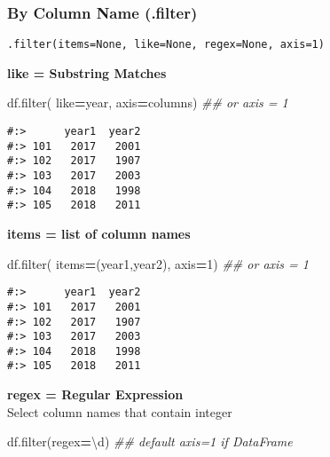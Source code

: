 \documentclass[
]{book}
\newenvironment{Shaded}{\begin{snugshade}}{\end{snugshade}}
\newcommand{\BuiltInTok}[1]{#1}
\newcommand{\CommentTok}[1]{\textcolor[rgb]{0.37,0.37,0.37}{\textit{#1}}}
\newcommand{\DecValTok}[1]{\textcolor[rgb]{0.06,0.06,0.06}{#1}}
\newcommand{\NormalTok}[1]{#1}
\newcommand{\OperatorTok}[1]{\textcolor[rgb]{0.43,0.43,0.43}{\textbf{#1}}}
\newcommand{\StringTok}[1]{\textcolor[rgb]{0.5,0.5,0.5}{#1}}
\begin{document}
\hypertarget{by-column-name-.filter}{%
\subsubsection{By Column Name (.filter)}\label{by-column-name-.filter}}

\texttt{.filter(items=None,\ like=None,\ regex=None,\ axis=1)}

\textbf{like = Substring Matches}

\begin{Shaded}
\begin{Highlighting}[]
\NormalTok{df.}\BuiltInTok{filter}\NormalTok{( like}\OperatorTok{=}\StringTok{\textquotesingle{}year\textquotesingle{}}\NormalTok{,  axis}\OperatorTok{=}\StringTok{\textquotesingle{}columns\textquotesingle{}}\NormalTok{)  }\CommentTok{\#\# or axis = 1}
\end{Highlighting}
\end{Shaded}

\begin{verbatim}
#:>      year1  year2
#:> 101   2017   2001
#:> 102   2017   1907
#:> 103   2017   2003
#:> 104   2018   1998
#:> 105   2018   2011
\end{verbatim}

\textbf{items = list of column names}

\begin{Shaded}
\begin{Highlighting}[]
\NormalTok{df.}\BuiltInTok{filter}\NormalTok{( items}\OperatorTok{=}\NormalTok{(}\StringTok{\textquotesingle{}year1\textquotesingle{}}\NormalTok{,}\StringTok{\textquotesingle{}year2\textquotesingle{}}\NormalTok{),  axis}\OperatorTok{=}\DecValTok{1}\NormalTok{)  }\CommentTok{\#\# or axis = 1}
\end{Highlighting}
\end{Shaded}

\begin{verbatim}
#:>      year1  year2
#:> 101   2017   2001
#:> 102   2017   1907
#:> 103   2017   2003
#:> 104   2018   1998
#:> 105   2018   2011
\end{verbatim}

\textbf{regex = Regular Expression}\\
Select column names that contain integer

\begin{Shaded}
\begin{Highlighting}[]
\NormalTok{df.}\BuiltInTok{filter}\NormalTok{(regex}\OperatorTok{=}\StringTok{\textquotesingle{}\textbackslash{}d\textquotesingle{}}\NormalTok{)  }\CommentTok{\#\# default axis=1 if DataFrame}
\end{Highlighting}
\end{Shaded}
\end{document}
